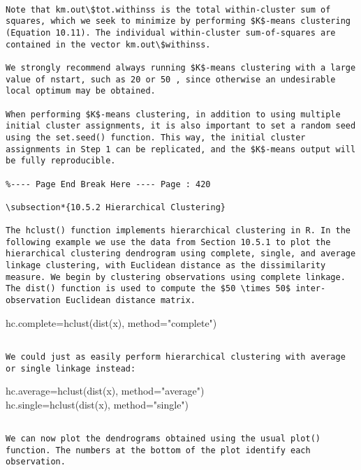 \documentclass[10pt]{article}
\begin{document}
\begin{verbatim}

Note that km.out\$tot.withinss is the total within-cluster sum of squares, which we seek to minimize by performing $K$-means clustering (Equation 10.11). The individual within-cluster sum-of-squares are contained in the vector km.out\$withinss.

We strongly recommend always running $K$-means clustering with a large value of nstart, such as 20 or 50 , since otherwise an undesirable local optimum may be obtained.

When performing $K$-means clustering, in addition to using multiple initial cluster assignments, it is also important to set a random seed using the set.seed() function. This way, the initial cluster assignments in Step 1 can be replicated, and the $K$-means output will be fully reproducible.

%---- Page End Break Here ---- Page : 420

\subsection*{10.5.2 Hierarchical Clustering}

The hclust() function implements hierarchical clustering in R. In the following example we use the data from Section 10.5.1 to plot the hierarchical clustering dendrogram using complete, single, and average linkage clustering, with Euclidean distance as the dissimilarity measure. We begin by clustering observations using complete linkage. The dist() function is used to compute the $50 \times 50$ inter-observation Euclidean distance matrix.
\end{verbatim}

\begin{displayquote}
hc.complete=hclust(dist(x), method="complete")
\end{displayquote}

\begin{verbatim}

We could just as easily perform hierarchical clustering with average or single linkage instead:
\end{verbatim}

\begin{displayquote}
hc.average=hclust(dist(x), method="average")\\
hc.single=hclust(dist(x), method="single")
\end{displayquote}

\begin{verbatim}

We can now plot the dendrograms obtained using the usual plot() function. The numbers at the bottom of the plot identify each observation.
\end{verbatim}
\end{document}
